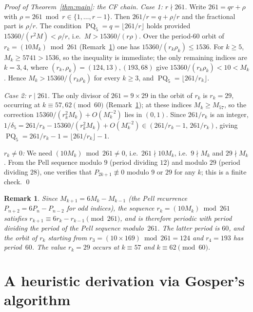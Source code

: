 \documentclass[10pt,a4paper]{amsart}
\newtheorem{remark}[theorem]{Remark}
\newcommand{\floor}[1]{\lfloor #1 \rfloor}
\DeclareMathOperator{\PQ}{PQ}
\begin{document}
\begin{proof}[Proof of Theorem~\ref{thm:main}: the CF chain]
  \emph{Case 1: $r \nmid 261$.}  Write $261 = qr + \rho$ with
  $\rho = 261 \bmod r \in \{1,\ldots,r-1\}$.  Then $261/r = q + \rho/r$
  and the fractional part is $\rho/r$.  The condition
  $\PQ_5 = q = \floor{261/r}$ holds provided $15360/(r^2 M) < \rho/r$,
  i.e.\ $M > 15360/(r\rho)$.  Over the period-$60$ orbit of
  $r_k = (10M_k) \bmod 261$ (Remark~\ref{rem:rk-orbit}) one has
  $15360/(r_k \rho_k) \le 1536$.  For $k \ge 5$, $M_k \ge 5741 > 1536$, so the
  inequality is immediate; the only remaining indices are $k = 3, 4$, where
  $(r_k,\rho_k) = (124,13), (193,68)$ give $15360/(r_k\rho_k) < 10 < M_k$.
  Hence $M_k > 15360/(r_k\rho_k)$ for every $k \ge 3$, and
  $\PQ_5 = \floor{261/r_k}$.

  \emph{Case 2: $r \mid 261$.}  The only divisor of $261 = 9 \times 29$ in the
  orbit of $r_k$ is $r_k = 29$, occurring at $k \equiv 57, 62 \pmod{60}$
  (Remark~\ref{rem:rk-orbit}); at these indices $M_k \ge M_{57}$, so the
  correction $15360/(r_k^2 M_k) + O(M_k^{-2})$ lies in $(0,1)$.  Since $261/r_k$
  is an integer, $1/\delta_5 = 261/r_k - 15360/(r_k^2 M_k) + O(M_k^{-2}) \in
  (261/r_k - 1,\, 261/r_k)$, giving $\PQ_5 = 261/r_k - 1 = \floor{261/r_k} - 1$.

  \emph{$r_k \neq 0$:}  We need $(10M_k) \bmod 261 \neq 0$,
  i.e.\ $261 \nmid 10M_k$, i.e.\ $9 \nmid M_k$ and $29 \nmid M_k$.
  From the Pell sequence modulo $9$ (period dividing $12$) and modulo
  $29$ (period dividing $28$), one verifies that $P_{2k+1} \not\equiv 0$
  modulo $9$ or $29$ for any $k$; this is a finite check.
  \qed
\end{proof}


\begin{remark}\label{rem:rk-orbit}
  Since $M_{k+1} = 6M_k - M_{k-1}$ (the Pell recurrence $P_{n+2} =
  6P_n - P_{n-2}$ for odd indices), the sequence $r_k = (10M_k) \bmod 261$
  satisfies $r_{k+1} \equiv 6r_k - r_{k-1} \pmod{261}$, and is therefore
  periodic with period dividing the period of the Pell sequence modulo~$261$.
  The latter period is $60$, and the orbit of $r_k$ starting from
  $r_3 = (10 \times 169) \bmod 261 = 124$ and $r_4 = 193$ has period~$60$.
  The value $r_k = 29$ occurs at $k \equiv 57$ and $k \equiv 62 \pmod{60}$.
\end{remark}

\section{A heuristic derivation via Gosper's algorithm}
\label{sec:gosper}
\end{document}
